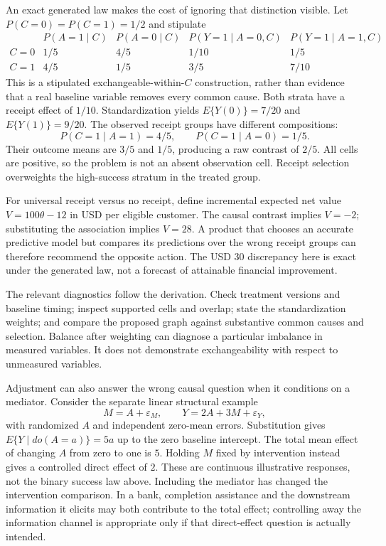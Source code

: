 An exact generated law makes the cost of ignoring that distinction visible.
Let $P(C=0)=P(C=1)=1/2$ and stipulate
\[
\begin{array}{c|cc|cc}
 &P(A=1\mid C)&P(A=0\mid C)
 &P(Y=1\mid A=0,C)&P(Y=1\mid A=1,C)\\ \hline
 C=0&1/5&4/5&1/10&1/5\\
 C=1&4/5&1/5&3/5&7/10
\end{array}
\]
This is a stipulated exchangeable-within-$C$ construction, rather than
evidence that a real baseline variable removes every common cause.
Both strata have a receipt effect of $1/10$. Standardization yields
$E\{Y(0)\}=7/20$ and $E\{Y(1)\}=9/20$.
The observed receipt groups have different compositions:
\[
 P(C=1\mid A=1)=4/5,\qquad P(C=1\mid A=0)=1/5.
\]
Their outcome means are $3/5$ and $1/5$, producing a raw contrast of
$2/5$. All cells are positive, so the problem is not an absent observation
cell. Receipt selection overweights the high-success stratum in the
treated group.\citep{exec17_s3_exact}

For universal receipt versus no receipt, define incremental expected
net value $V=100\theta-12$ in USD per eligible customer. The causal contrast
implies $V=-2$; substituting the association implies $V=28$.
A product that chooses an accurate predictive model but compares its
predictions over the wrong receipt groups can therefore recommend the
opposite action. The USD 30 discrepancy here is exact under the generated
law, not a forecast of attainable financial improvement.

The relevant diagnostics follow the derivation. Check treatment versions
and baseline timing; inspect supported cells and overlap; state the
standardization weights; and compare the proposed graph against substantive
common causes and selection. Balance after weighting can diagnose a
particular imbalance in measured variables. It does not demonstrate
exchangeability with respect to unmeasured variables.

Adjustment can also answer the wrong causal question when it conditions
on a mediator. Consider the separate linear structural example
\[
 M=A+\varepsilon_M,\qquad
 Y=2A+3M+\varepsilon_Y,
\]
with randomized $A$ and independent zero-mean errors. Substitution gives
$E\{Y\mid do(A=a)\}=5a$ up to the zero baseline intercept. The total
mean effect of changing $A$ from zero to one is $5$. Holding $M$ fixed
by intervention instead gives a controlled direct effect of $2$.
These are continuous illustrative responses, not the binary success law
above. Including the mediator has changed the intervention comparison.
In a bank, completion assistance and the downstream information it
elicits may both contribute to the total effect; controlling away the
information channel is appropriate only if that direct-effect question
is actually intended.\citep{exec17_s3_exact,pearl2009}

